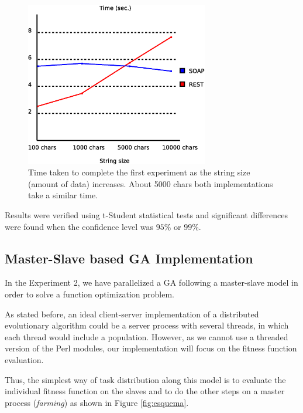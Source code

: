 \documentclass[final,1p,times]{elsarticle}
\begin{document}
\begin{figure}[!ht]
\begin{center}
\includegraphics[width=8cm]{exp1.eps}
\caption{Time taken to complete the first experiment as the string size (amount of data) increases. About 5000 chars both implementations take a similar time.}
\label{figure:exp1}
\end{center}
\end{figure}

Results were verified using t-Student statistical tests and significant differences were found when the confidence level was $95\%$ or $99\%$. 

\subsection{Master-Slave based GA Implementation}
\label{subsect:experiment2}

In the Experiment 2, we have parallelized a GA following a master-slave model in order to solve a function optimization problem.

As stated before, an ideal client-server implementation of a distributed evolutionary algorithm could be a server process with several threads, in which each thread would include a population.
However, as we cannot use a threaded version of the Perl modules, our implementation will focus on the fitness function evaluation.

Thus, the simplest way of task distribution along this model is to evaluate the individual fitness function on the slaves and to do the other steps on a master process ({\em farming}) as shown in Figure \ref{fig:esquema}.
\end{document}
